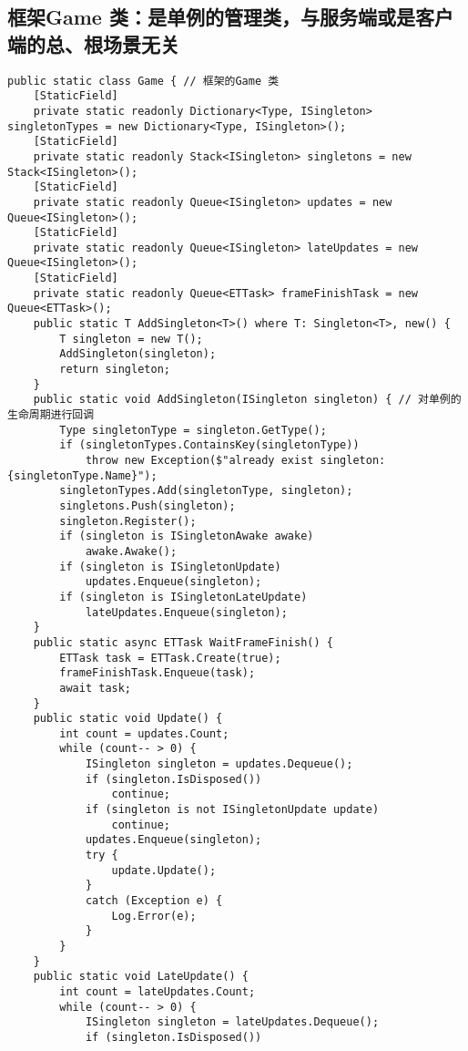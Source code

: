 \documentclass[9pt, b5paper]{article}
\begin{document}
\subsection{框架Game 类：是单例的管理类，与服务端或是客户端的总、根场景无关}
\label{sec-7-2}
\begin{verbatim}
public static class Game { // 框架的Game 类
    [StaticField]
    private static readonly Dictionary<Type, ISingleton> singletonTypes = new Dictionary<Type, ISingleton>();
    [StaticField]
    private static readonly Stack<ISingleton> singletons = new Stack<ISingleton>();
    [StaticField]
    private static readonly Queue<ISingleton> updates = new Queue<ISingleton>();
    [StaticField]
    private static readonly Queue<ISingleton> lateUpdates = new Queue<ISingleton>();
    [StaticField]
    private static readonly Queue<ETTask> frameFinishTask = new Queue<ETTask>();
    public static T AddSingleton<T>() where T: Singleton<T>, new() {
        T singleton = new T();
        AddSingleton(singleton);
        return singleton;
    }
    public static void AddSingleton(ISingleton singleton) { // 对单例的生命周期进行回调
        Type singletonType = singleton.GetType();
        if (singletonTypes.ContainsKey(singletonType)) 
            throw new Exception($"already exist singleton: {singletonType.Name}");
        singletonTypes.Add(singletonType, singleton);
        singletons.Push(singleton);
        singleton.Register();
        if (singleton is ISingletonAwake awake) 
            awake.Awake();
        if (singleton is ISingletonUpdate) 
            updates.Enqueue(singleton);
        if (singleton is ISingletonLateUpdate) 
            lateUpdates.Enqueue(singleton);
    }
    public static async ETTask WaitFrameFinish() {
        ETTask task = ETTask.Create(true);
        frameFinishTask.Enqueue(task);
        await task;
    }
    public static void Update() {
        int count = updates.Count;
        while (count-- > 0) {
            ISingleton singleton = updates.Dequeue();
            if (singleton.IsDisposed()) 
                continue;
            if (singleton is not ISingletonUpdate update) 
                continue;
            updates.Enqueue(singleton);
            try {
                update.Update();
            }
            catch (Exception e) {
                Log.Error(e);
            }
        }
    }
    public static void LateUpdate() {
        int count = lateUpdates.Count;
        while (count-- > 0) {
            ISingleton singleton = lateUpdates.Dequeue();
            if (singleton.IsDisposed()) 

\end{verbatim}
\end{document}
